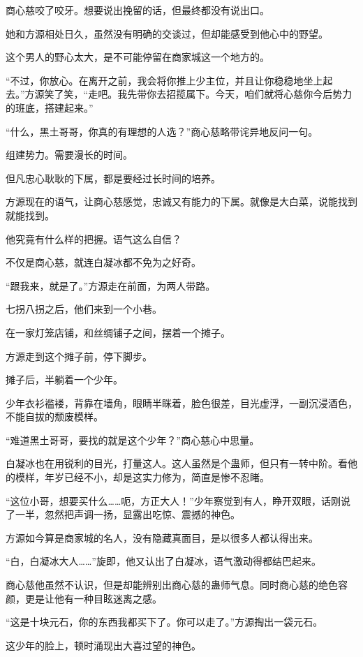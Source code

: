 \begin{this_body}
商心慈咬了咬牙。想要说出挽留的话，但最终都没有说出口。

她和方源相处日久，虽然没有明确的交谈过，但却能感受到他心中的野望。

这个男人的野心太大，是不可能停留在商家城这一个地方的。

“不过，你放心。在离开之前，我会将你推上少主位，并且让你稳稳地坐上起去。”方源笑了笑，“走吧。我先带你去招揽属下。今天，咱们就将心慈你今后势力的班底，搭建起来。”

“什么，黑土哥哥，你真的有理想的人选？”商心慈略带诧异地反问一句。

组建势力。需要漫长的时间。

但凡忠心耿耿的下属，都是要经过长时间的培养。

方源现在的语气，让商心慈感觉，忠诚又有能力的下属。就像是大白菜，说能找到就能找到。

他究竟有什么样的把握。语气这么自信？

不仅是商心慈，就连白凝冰都不免为之好奇。

“跟我来，就是了。”方源走在前面，为两人带路。

七拐八拐之后，他们来到一个小巷。

在一家灯笼店铺，和丝绸铺子之间，摆着一个摊子。

方源走到这个摊子前，停下脚步。

摊子后，半躺着一个少年。

少年衣衫褴褛，背靠在墙角，眼睛半眯着，脸色很差，目光虚浮，一副沉浸酒色，不能自拔的颓废模样。

“难道黑土哥哥，要找的就是这个少年？”商心慈心中思量。

白凝冰也在用锐利的目光，打量这人。这人虽然是个蛊师，但只有一转中阶。看他的模样，年岁已经不小，却是这实力修为，简直是惨不忍睹。

“这位小哥，想要买什么……呃，方正大人！”少年察觉到有人，睁开双眼，话刚说了一半，忽然把声调一扬，显露出吃惊、震撼的神色。

方源如今算是商家城的名人，没有隐藏真面目，是以很多人都认得出来。

“白，白凝冰大人……”旋即，他又认出了白凝冰，语气激动得都结巴起来。

商心慈他虽然不认识，但是却能辨别出商心慈的蛊师气息。同时商心慈的绝色容颜，更是让他有一种目眩迷离之感。

“这是十块元石，你的东西我都买下了。你可以走了。”方源掏出一袋元石。

这少年的脸上，顿时涌现出大喜过望的神色。


\end{this_body}
